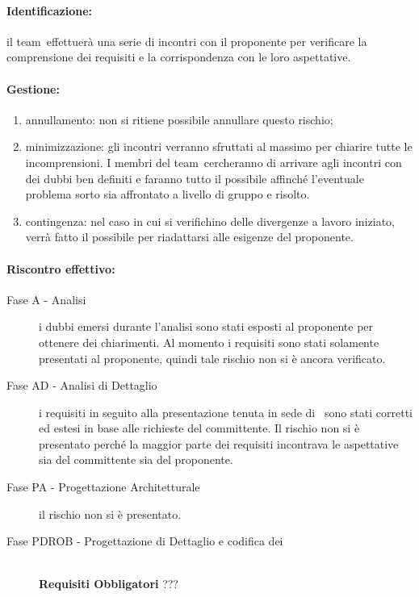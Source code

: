\documentclass[../PianoProgetto.tex]{subfiles}
\begin{document}
	\paragraph*{Identificazione:} il team\g\ effettuerà una serie di incontri con il proponente per verificare la comprensione dei requisiti e la corrispondenza con le loro aspettative.
	
	\paragraph*{Gestione:}
	\begin{enumerate}
		\item annullamento: non si ritiene possibile annullare questo rischio;
		\item minimizzazione: gli incontri verranno sfruttati al massimo per chiarire tutte le incomprensioni. I membri del team\g\ cercheranno di arrivare agli incontri con dei dubbi ben definiti e faranno tutto il possibile affinché l'eventuale problema sorto sia affrontato a livello di gruppo e risolto.
		\item contingenza: nel caso in cui si verifichino delle divergenze a lavoro iniziato, verrà fatto il possibile per riadattarsi alle esigenze del proponente.
	\end{enumerate}	
	
	
	\paragraph*{Riscontro effettivo:}
		\begin{description}
			\item[Fase A - Analisi] i dubbi emersi durante l'analisi sono stati esposti al proponente per ottenere dei chiarimenti. Al momento i requisiti sono stati solamente presentati al proponente, quindi tale rischio non si è ancora verificato.
			\item[Fase AD - Analisi di Dettaglio]  i requisiti in seguito alla presentazione tenuta in sede di \revisionedeirequisiti\ sono stati corretti ed estesi in base alle richieste del committente. Il rischio non si è presentato perché la maggior parte dei requisiti incontrava le aspettative sia del committente sia del proponente. 
			\item[Fase PA - Progettazione Architetturale] il rischio non si è presentato.
			\item[Fase PDROB - Progettazione di Dettaglio e codifica dei]  \ \\
					\textbf{Requisiti Obbligatori} ???
		\end{description}

			
\end{document}
